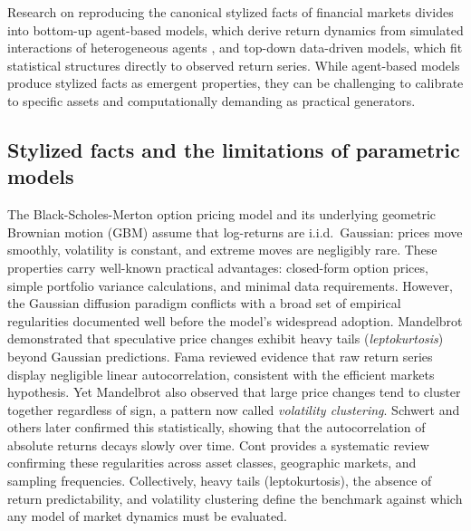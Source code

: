 Research on reproducing the canonical stylized facts of financial markets divides into bottom-up agent-based models, which derive return dynamics from simulated interactions of heterogeneous agents \cite{lux_marchesi_1999, cont_bouchaud_2000, chen_herding_2015, farmer_joshi_2002, lebaron_agent_2006, arthur_complexity_2021, farmer_quantitative_2025}, and top-down data-driven models, which fit statistical structures directly to observed return series. While agent-based models produce stylized facts as emergent properties, they can be challenging to calibrate to specific assets and computationally demanding as practical generators. 

\subsection{Stylized facts and the limitations of parametric models}
The Black-Scholes-Merton option pricing model \cite{black_scholes_1973} and its underlying geometric Brownian motion (GBM) assume that log-returns are i.i.d.\ Gaussian: prices move smoothly, volatility is constant, and extreme moves are negligibly rare. These properties carry well-known practical advantages: closed-form option prices, simple portfolio variance calculations, and minimal data requirements. However, the Gaussian diffusion paradigm conflicts with a broad set of empirical regularities documented well before the model's widespread adoption. Mandelbrot \cite{mandelbrot_variation_1963} demonstrated that speculative price changes exhibit heavy tails (\textit{leptokurtosis}) beyond Gaussian predictions. Fama \cite{fama_efficient_1970} reviewed evidence that raw return series display negligible linear autocorrelation, consistent with the efficient markets hypothesis. Yet Mandelbrot also observed that large price changes tend to cluster together regardless of sign, a pattern now called \textit{volatility clustering}. Schwert \cite{schwert_why_1989} and others later confirmed this statistically, showing that the autocorrelation of absolute returns decays slowly over time. Cont \cite{cont_empirical_2001} provides a systematic review confirming these regularities across asset classes, geographic markets, and sampling frequencies. Collectively, heavy tails (leptokurtosis), the absence of return predictability, and volatility clustering define the benchmark against which any model of market dynamics must be evaluated.


